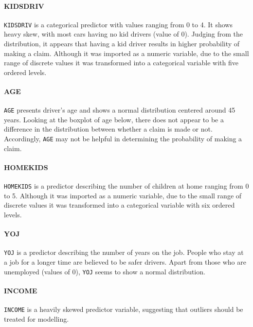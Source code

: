 \documentclass[]{article}
\let\oldparagraph\paragraph
\renewcommand{\paragraph}[1]{\oldparagraph{#1}\mbox{}}
\begin{document}
\paragraph{KIDSDRIV}\label{kidsdriv}

\texttt{KIDSDRIV} is a categorical predictor with values ranging from 0
to 4. It shows heavy skew, with most cars having no kid drivers (value
of 0). Judging from the distribution, it appears that having a kid
driver results in higher probability of making a claim. Although it was
imported as a numeric variable, due to the small range of discrete
values it was transformed into a categorical variable with five ordered
levels.

\paragraph{AGE}\label{age}

\texttt{AGE} presents driver's age and shows a normal distribution
centered around 45 years. Looking at the boxplot of age below, there
does not appear to be a difference in the distribution between whether a
claim is made or not. Accordingly, \texttt{AGE} may not be helpful in
determining the probability of making a claim.

\paragraph{HOMEKIDS}\label{homekids}

\texttt{HOMEKIDS} is a predictor describing the number of children at
home ranging from 0 to 5. Although it was imported as a numeric
variable, due to the small range of discrete values it was transformed
into a categorical variable with six ordered levels.

\paragraph{YOJ}\label{yoj}

\texttt{YOJ} is a predictor describing the number of years on the job.
People who stay at a job for a longer time are believed to be safer
drivers. Apart from those who are unemployed (values of 0), \texttt{YOJ}
seems to show a normal distribution.

\paragraph{INCOME}\label{income}

\texttt{INCOME} is a heavily skewed predictor variable, suggesting that
outliers should be treated for modelling.
\end{document}
